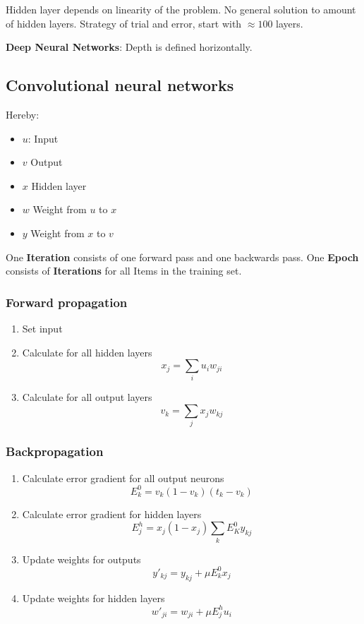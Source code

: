 \documentclass[
    fontsize      = 11pt,
    paper         = a4,
    twoside       = false,
    parskip       = half,
    pagesize      = false,
]{scrartcl}
\providecommand{\tightlist}{%
  \setlength{\itemsep}{0pt}\setlength{\parskip}{0pt}}
\begin{document}
Hidden layer depends on linearity of the problem. No general solution to
amount of hidden layers. Strategy of trial and error, start with
\(\approx 100\) layers.

\textbf{Deep Neural Networks}: Depth is defined horizontally.

\hypertarget{convolutional-neural-networks}{%
\subsection{Convolutional neural
networks}\label{convolutional-neural-networks}}

Hereby:

\begin{itemize}
\tightlist
\item
  \(u\): Input
\item
  \(v\) Output
\item
  \(x\) Hidden layer
\item
  \(w\) Weight from \(u\) to \(x\)
\item
  \(y\) Weight from \(x\) to \(v\)
\end{itemize}

One \textbf{Iteration} consists of one forward pass and one backwards
pass. One \textbf{Epoch} consists of \textbf{Iterations} for all Items
in the training set.

\hypertarget{forward-propagation}{%
\subsubsection{Forward propagation}\label{forward-propagation}}

\begin{enumerate}
\def\labelenumi{\arabic{enumi}.}
\tightlist
\item
  Set input
\item
  Calculate for all hidden layers \[x_j = \sum_i u_i w_{ji}\]
\item
  Calculate for all output layers \[v_k = \sum_j x_j w_{kj}\]
\end{enumerate}

\hypertarget{backpropagation}{%
\subsubsection{Backpropagation}\label{backpropagation}}

\begin{enumerate}
\def\labelenumi{\arabic{enumi}.}
\tightlist
\item
  Calculate error gradient for all output neurons
  \[E_k^0 = v_k (1-v_k)(t_k-v_k)\]
\item
  Calculate error gradient for hidden layers
  \[E_j^h = x_j(1-x_j) \sum_k E_K^0 y_{kj}\]
\item
  Update weights for outputs \[y\prime_{kj} = y_{kj} + \mu E_k^0 x_j\]
\item
  Update weights for hidden layers
  \[w\prime_{ji} = w_{ji} + \mu E_j^h u_i\]
\end{enumerate}
\end{document}
